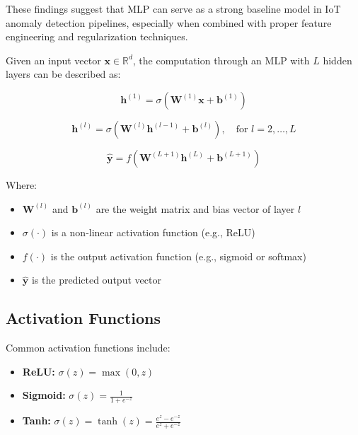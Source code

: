 \begin{ZhChapter}
    These findings suggest that MLP can serve as a strong baseline model in IoT anomaly detection pipelines, especially when combined with proper feature engineering and regularization techniques.

    Given an input vector $\mathbf{x} \in \mathbb{R}^d$, the computation through an MLP with $L$ hidden layers can be described as:

    \begin{equation}
        \mathbf{h}^{(1)} = \sigma\left( \mathbf{W}^{(1)} \mathbf{x} + \mathbf{b}^{(1)} \right)
        \label{eq:mlp_layer1}
    \end{equation}

    \begin{equation}
        \mathbf{h}^{(l)} = \sigma\left( \mathbf{W}^{(l)} \mathbf{h}^{(l-1)} + \mathbf{b}^{(l)} \right), \quad \text{for } l=2, \dots, L
        \label{eq:mlp_hidden}
    \end{equation}

    \begin{equation}
        \hat{\mathbf{y}} = f\left( \mathbf{W}^{(L+1)} \mathbf{h}^{(L)} + \mathbf{b}^{(L+1)} \right)
        \label{eq:mlp_output}
    \end{equation}

    Where:
    \begin{itemize}
        \item $\mathbf{W}^{(l)}$ and $\mathbf{b}^{(l)}$ are the weight matrix and bias vector of layer $l$
        \item $\sigma(\cdot)$ is a non-linear activation function (e.g., ReLU)
        \item $f(\cdot)$ is the output activation function (e.g., sigmoid or softmax)
        \item $\hat{\mathbf{y}}$ is the predicted output vector
    \end{itemize}

    \subsection{Activation Functions}

    Common activation functions include:

    \begin{itemize}
        \item \textbf{ReLU:} $\sigma(z) = \max(0, z)$
        \item \textbf{Sigmoid:} $\sigma(z) = \frac{1}{1 + e^{-z}}$
        \item \textbf{Tanh:} $\sigma(z) = \tanh(z) = \frac{e^z - e^{-z}}{e^z + e^{-z}}$
    \end{itemize}


\end{ZhChapter}
